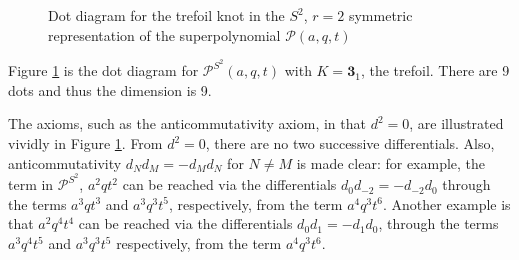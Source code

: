 \documentclass[a4paper,titlepage,twoside]{book}
\begin{document}
\begin{figure}[h]
\begin{center}
\end{center}
\caption{Dot diagram for the trefoil knot in the $S^2$, $r=2$ symmetric representation of the superpolynomial $\mathcal{P}{  (a,q,t)  }$ } \label{Fig:dotdiagramtrefoilr02}
\end{figure}

Figure \ref{Fig:dotdiagramtrefoilr02} is the dot diagram for $\mathcal{P}^{ S^2  }{ (a,q,t) }$ with $K=\mathbf{3}_1$, the trefoil. There are 9 dots and thus the dimension is 9.  


The axioms, such as the anticommutativity axiom, in that $d^2 =0$, are illustrated vividly in Figure \ref{Fig:dotdiagramtrefoilr02}.  From $d^2=0$, there are no two successive differentials.  Also, anticommutativity $d_N d_M = -d_Md_N$ for $N\neq M$ is made clear: for example, the term in $\mathcal{P}^{ S^2  }$, $a^2 q t^2$ can be reached via the differentials $d_0 d_{-2} = -d_{-2}d_0$ through the terms $a^3qt^3$ and $a^3q^3t^5$, respectively, from the term $a^4 q^3 t^6$.  Another example is that  $a^2 q^4 t^4$ can be reached via the differentials $d_0 d_1 = -d_1 d_0$, through the terms $a^3q^4t^5$ and $a^3 q^3t^5$ respectively, from the term $a^4 q^3 t^6$.
\end{document}
